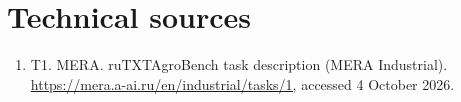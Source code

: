 \documentclass[10pt,a4paper]{article}
\begin{document}
\section*{Technical sources}
\begingroup\sloppy\small \begin{enumerate}[label={},leftmargin=0.9cm,itemindent=-0.9cm,itemsep=0pt,parsep=0pt,topsep=2pt]
\item T1. MERA. ruTXTAgroBench task description (MERA Industrial). \url{https://mera.a-ai.ru/en/industrial/tasks/1,} accessed 4 October 2026.
\end{enumerate}\endgroup
\end{document}
